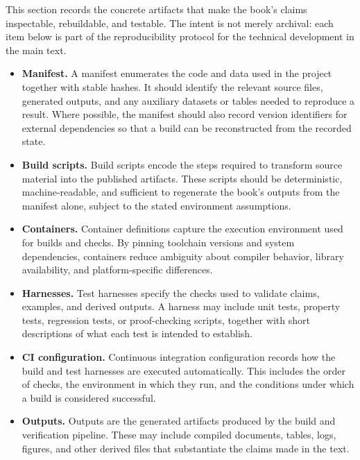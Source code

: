 This section records the concrete artifacts that make the book's claims inspectable, rebuildable, and testable. The intent is not merely archival: each item below is part of the reproducibility protocol for the technical development in the main text.

\begin{itemize}
  \item \textbf{Manifest.} A manifest enumerates the code and data used in the project together with stable hashes. It should identify the relevant source files, generated outputs, and any auxiliary datasets or tables needed to reproduce a result. Where possible, the manifest should also record version identifiers for external dependencies so that a build can be reconstructed from the recorded state.

  \item \textbf{Build scripts.} Build scripts encode the steps required to transform source material into the published artifacts. These scripts should be deterministic, machine-readable, and sufficient to regenerate the book's outputs from the manifest alone, subject to the stated environment assumptions.

  \item \textbf{Containers.} Container definitions capture the execution environment used for builds and checks. By pinning toolchain versions and system dependencies, containers reduce ambiguity about compiler behavior, library availability, and platform-specific differences.

  \item \textbf{Harnesses.} Test harnesses specify the checks used to validate claims, examples, and derived outputs. A harness may include unit tests, property tests, regression tests, or proof-checking scripts, together with short descriptions of what each test is intended to establish.

  \item \textbf{CI configuration.} Continuous integration configuration records how the build and test harnesses are executed automatically. This includes the order of checks, the environment in which they run, and the conditions under which a build is considered successful.

  \item \textbf{Outputs.} Outputs are the generated artifacts produced by the build and verification pipeline. These may include compiled documents, tables, logs, figures, and other derived files that substantiate the claims made in the text.
\end{itemize}

